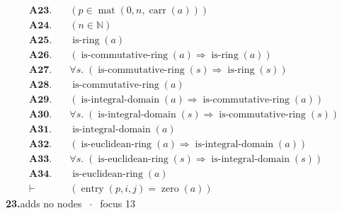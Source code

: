 \documentclass[11pt]{article}
\theoremstyle{plain}
\newcommand{\fit}[1]{\resizebox{\ifdim\width>\linewidth\linewidth\else\width\fi}{!}{#1}}
\begin{document}
\begin{align*}
  \mathbf{A23.}\quad & (p \in \operatorname{mat}(0, n, \operatorname{carr}(a))) \\
  \mathbf{A24.}\quad & (n \in \mathbb{N}) \\
  \mathbf{A25.}\quad & \operatorname{is\text{-}ring}(a) \\
  \mathbf{A26.}\quad & (\operatorname{is\text{-}commutative\text{-}ring}(a) \Rightarrow \operatorname{is\text{-}ring}(a)) \\
  \mathbf{A27.}\quad & \forall s.\; (\operatorname{is\text{-}commutative\text{-}ring}(s) \Rightarrow \operatorname{is\text{-}ring}(s)) \\
  \mathbf{A28.}\quad & \operatorname{is\text{-}commutative\text{-}ring}(a) \\
  \mathbf{A29.}\quad & (\operatorname{is\text{-}integral\text{-}domain}(a) \Rightarrow \operatorname{is\text{-}commutative\text{-}ring}(a)) \\
  \mathbf{A30.}\quad & \forall s.\; (\operatorname{is\text{-}integral\text{-}domain}(s) \Rightarrow \operatorname{is\text{-}commutative\text{-}ring}(s)) \\
  \mathbf{A31.}\quad & \operatorname{is\text{-}integral\text{-}domain}(a) \\
  \mathbf{A32.}\quad & (\operatorname{is\text{-}euclidean\text{-}ring}(a) \Rightarrow \operatorname{is\text{-}integral\text{-}domain}(a)) \\
  \mathbf{A33.}\quad & \forall s.\; (\operatorname{is\text{-}euclidean\text{-}ring}(s) \Rightarrow \operatorname{is\text{-}integral\text{-}domain}(s)) \\
  \mathbf{A34.}\quad & \operatorname{is\text{-}euclidean\text{-}ring}(a) \\
  \vdash\quad & (\operatorname{entry}(p, i, j) = \operatorname{zero}(a))
\end{align*}
\medskip\noindent\textbf{23.}\quad \fit{\texttt{(ai '(not (<= i 0)))}}\hfill{\small adds no nodes $\;\cdot\;$ focus 13}\\[2pt]
\end{document}
